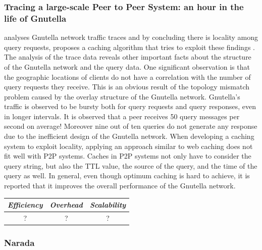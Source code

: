 \subsubsection{Tracing a large-scale Peer to Peer System: an hour in the life
of Gnutella}
\cite{Markatos02} analyses Gnutella network traffic traces and by concluding
there is locality among query requests, proposes a caching algorithm that tries
to exploit these findings . The analysis of the trace data reveals other
important facts about the structure of the Gnutella network and the query data.
One significant observation is that the geographic locations of clients do not
have a correlation with the number of query requests they receive. This is an
obvious result of the topology mismatch problem caused by the overlay structure
of the Gnutella network. Gnutella's traffic is observed to be bursty both for
query requests and query responses, even in longer intervals. It is observed
that a peer receives 50 query messages per second on average! Moreover nine out
of ten queries do not generate any response due to the inefficient design of
the Gnutella network. When developing a caching system to exploit locality,
applying an approach similar to web caching does not fit well with P2P systems.
Caches in P2P systems not only have to consider the query string, but also
the TTL value, the source of the query, and the time of the query as well.  In
general, even though optimum caching is hard to achieve, it is reported that
it improves the overall performance of the Gnutella network.

\begin{center}
\begin{tabular}{ccc}
\emph{Efficiency} & \emph{Overhead} & \emph{Scalability} \\
\hline
%
? &
%
? &
%
?
\end{tabular}
\end{center}



\subsubsection{Narada}

